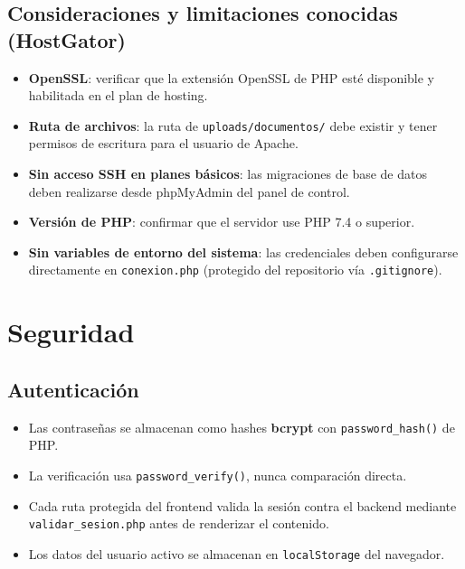 \documentclass[10pt,letterpaper]{report}
\begin{document}
\section{Consideraciones y limitaciones conocidas (HostGator)}

\begin{itemize}
  \item \textbf{OpenSSL}: verificar que la extensión OpenSSL de PHP esté disponible y habilitada en el plan de hosting.
  \item \textbf{Ruta de archivos}: la ruta de \texttt{uploads/documentos/} debe existir y tener permisos de escritura para el usuario de Apache.
  \item \textbf{Sin acceso SSH en planes básicos}: las migraciones de base de datos deben realizarse desde phpMyAdmin del panel de control.
  \item \textbf{Versión de PHP}: confirmar que el servidor use PHP 7.4 o superior.
  \item \textbf{Sin variables de entorno del sistema}: las credenciales deben configurarse directamente en \texttt{conexion.php} (protegido del repositorio vía \texttt{.gitignore}).
\end{itemize}

\chapter{Seguridad}

\section{Autenticación}

\begin{itemize}
  \item Las contraseñas se almacenan como hashes \textbf{bcrypt} con \texttt{password\_hash()} de PHP.
  \item La verificación usa \texttt{password\_verify()}, nunca comparación directa.
  \item Cada ruta protegida del frontend valida la sesión contra el backend mediante \texttt{validar\_sesion.php} antes de renderizar el contenido.
  \item Los datos del usuario activo se almacenan en \texttt{localStorage} del navegador.
\end{itemize}
\end{document}

